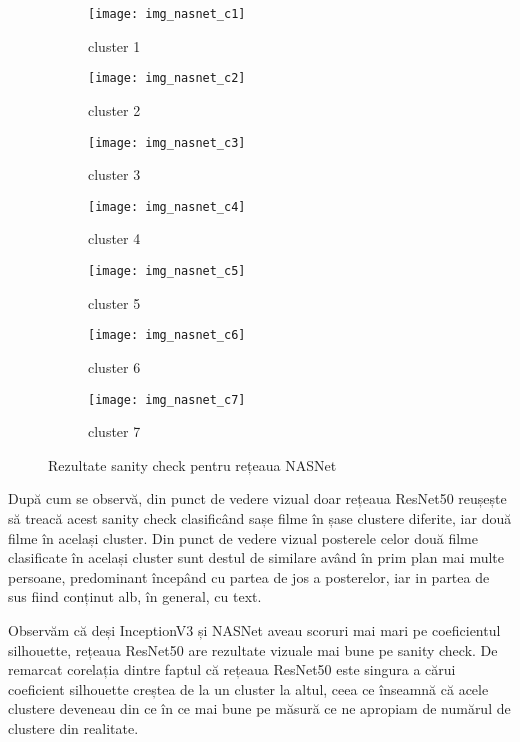 \begin{figure}[!h]
  \centering
  \begin{subfigure}[t]{0.45\textwidth}
    \caption{cluster 1}
    \texttt{[image: img\_nasnet\_c1]}
  \end{subfigure}
  \hfill
  \begin{subfigure}[t]{0.45\textwidth}
    \caption{cluster 2}
    \texttt{[image: img\_nasnet\_c2]}
  \end{subfigure}
   \hfill
  \begin{subfigure}[t]{0.45\textwidth}
    \caption{cluster 3}
    \texttt{[image: img\_nasnet\_c3]}
  \end{subfigure}
  \hfill
  \begin{subfigure}[t]{0.45\textwidth}
    \caption{cluster 4}
    \texttt{[image: img\_nasnet\_c4]}
  \end{subfigure}
  \hfill
  \begin{subfigure}[t]{0.45\textwidth}
    \caption{cluster 5}
    \texttt{[image: img\_nasnet\_c5]}
  \end{subfigure}
  \hfill
  \begin{subfigure}[t]{0.45\textwidth}
    \caption{cluster 6}
    \texttt{[image: img\_nasnet\_c6]}
  \end{subfigure}
    \hfill
  \begin{subfigure}[t]{0.45\textwidth}
    \caption{cluster 7}
    \texttt{[image: img\_nasnet\_c7]}
  \end{subfigure}
  \caption[Rezultate sanity check pentru rețeaua NASNet]{Rezultate sanity check pentru rețeaua NASNet}
\end{figure}

După cum se observă, din punct de vedere vizual doar rețeaua ResNet50 reușește să treacă acest sanity check clasificând sașe filme în șase clustere diferite, iar două filme în același cluster. Din punct de vedere vizual posterele celor două filme clasificate în același cluster sunt destul de similare având în prim plan mai multe persoane, predominant începând cu partea de jos a posterelor, iar in partea de sus fiind conținut alb, în general, cu text.

Observăm că deși InceptionV3 și NASNet aveau scoruri mai mari pe coeficientul silhouette, rețeaua ResNet50 are rezultate vizuale mai bune pe sanity check. De remarcat corelația dintre faptul că rețeaua ResNet50 este singura a cărui coeficient silhouette creștea de la un cluster la altul, ceea ce înseamnă că acele clustere deveneau din ce în ce mai bune pe măsură ce ne apropiam de numărul de clustere din realitate.

